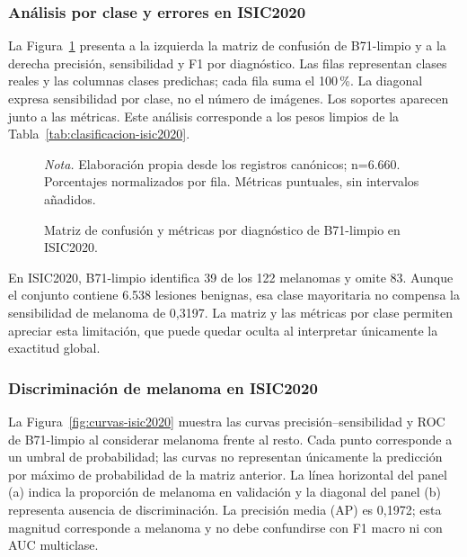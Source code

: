 \subsubsection{Análisis por clase y errores en ISIC2020}
La Figura~\ref{fig:errores-isic2020} presenta a la izquierda la matriz de confusión de B71-limpio y a la derecha precisión, sensibilidad y F1 por diagnóstico. Las filas representan clases reales y las columnas clases predichas; cada fila suma el 100\,\%. La diagonal expresa sensibilidad por clase, no el número de imágenes. Los soportes aparecen junto a las métricas. Este análisis corresponde a los pesos limpios de la Tabla~\ref{tab:clasificacion-isic2020}.

\begin{figure}[!htbp]
\caption{Matriz de confusión y métricas por diagnóstico de B71-limpio en ISIC2020.}\label{fig:errores-isic2020}
\centering

\par\smallskip
{\singlespacing\fontsize{11}{13}\selectfont\raggedright
\noindent\textit{Nota.} Elaboración propia desde los registros canónicos; n=6.660. Porcentajes normalizados por fila. Métricas puntuales, sin intervalos añadidos.\par}
\end{figure}
\FloatBarrier
En ISIC2020, B71-limpio identifica 39 de los 122 melanomas y omite 83. Aunque el conjunto contiene 6.538 lesiones benignas, esa clase mayoritaria no compensa la sensibilidad de melanoma de 0,3197. La matriz y las métricas por clase permiten apreciar esta limitación, que puede quedar oculta al interpretar únicamente la exactitud global.

\subsubsection{Discriminación de melanoma en ISIC2020}
La Figura~\ref{fig:curvas-isic2020} muestra las curvas precisión--sensibilidad y ROC de B71-limpio al considerar melanoma frente al resto. Cada punto corresponde a un umbral de probabilidad; las curvas no representan únicamente la predicción por máximo de probabilidad de la matriz anterior. La línea horizontal del panel (a) indica la proporción de melanoma en validación y la diagonal del panel (b) representa ausencia de discriminación. La precisión media (AP) es 0,1972; esta magnitud corresponde a melanoma y no debe confundirse con F1 macro ni con AUC multiclase.


